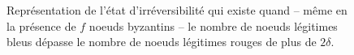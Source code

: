 \documentclass[letterpaper,twocolumn,10pt]{article}
\theoremstyle{definition}
\begin{document}
\begin{figure}[h]
\begin{center}

\caption{Représentation de l'état d'irréversibilité qui existe quand -- même en la présence de $f$ noeuds byzantins --
  le nombre de noeuds légitimes bleus dépasse le nombre de noeuds légitimes rouges de plus de $2\delta$.
}
\label{fig:states_feasible_solutions}
\end{center}
\end{figure}

\end{document}
